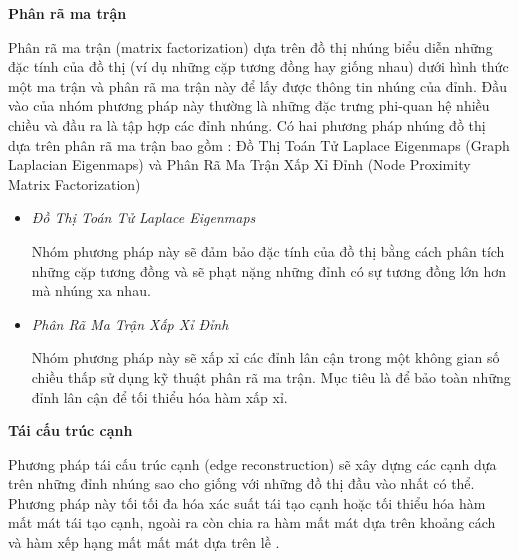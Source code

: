 \textbf{Phân rã ma trận}

Phân rã ma trận (matrix factorization) dựa trên đồ thị nhúng biểu diễn những đặc tính của đồ thị (ví dụ những cặp tương đồng hay giống nhau) dưới hình thức một ma trận và phân rã ma trận này để lấy được thông tin nhúng của đỉnh. Đầu vào của nhóm phương pháp này thường là những đặc trưng phi-quan hệ nhiều chiều và đầu ra là tập hợp các đỉnh nhúng. Có hai phương pháp nhúng đồ thị dựa trên phân rã ma trận bao gồm : Đồ Thị Toán Tử Laplace Eigenmaps (Graph Laplacian Eigenmaps) và Phân Rã Ma Trận Xấp Xỉ Đỉnh (Node Proximity Matrix Factorization)

\begin{itemize}
	\item \textit{Đồ Thị Toán Tử Laplace Eigenmaps}
	
	Nhóm phương pháp này sẽ đảm bảo đặc tính của đồ thị bằng cách phân tích những cặp tương đồng và sẽ phạt nặng những đỉnh có sự tương đồng lớn hơn mà nhúng xa nhau. 
	
	\item \textit{Phân Rã Ma Trận Xấp Xỉ Đỉnh}
	
	Nhóm phương pháp này sẽ xấp xỉ các đỉnh lân cận trong một không gian số chiều thấp sử dụng kỹ thuật phân rã ma trận. Mục tiêu là để bảo toàn những đỉnh lân cận để tối thiểu hóa hàm xấp xỉ.
\end{itemize}

\textbf{Tái cấu trúc cạnh}

Phương pháp tái cấu trúc cạnh (edge reconstruction) sẽ xây dựng các cạnh dựa trên những đỉnh nhúng sao cho giống với những đồ thị đầu vào nhất có thể. Phương pháp này tối tối đa hóa xác suất tái tạo cạnh hoặc tối thiểu hóa hàm mất mát tái tạo cạnh, ngoài ra còn chia ra hàm mất mát dựa trên khoảng cách và hàm xếp hạng mất mất mát dựa trên lề .

